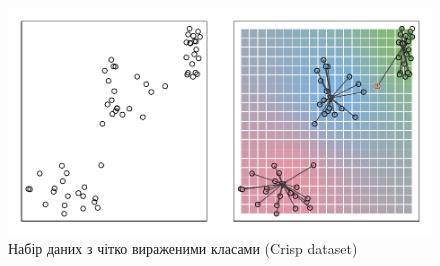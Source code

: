 \documentclass{vakthesis}
\begin{document}
\begin{figure}
\begin{center}
\includegraphics{clustering002.pdf}
\caption{Набір даних з чітко вираженими класами (Crisp dataset)}
\label{fig:clustering02}
\end{center}
\end{figure}
\end{document}
